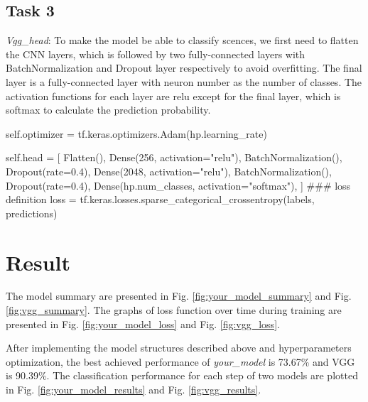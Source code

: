 \subsection*{Task 3}

\emph{Vgg\_head}: To make the model be able to classify scences, we first need to flatten the CNN layers, which is followed by two fully-connected layers with BatchNormalization and Dropout layer respectively to avoid overfitting. The final layer is a fully-connected layer with neuron number as the number of classes. The activation functions for each layer are relu except for the final layer, which is softmax to calculate the prediction probability.
    \begin{python}
self.optimizer = tf.keras.optimizers.Adam(hp.learning_rate)

self.head = [
    Flatten(),
    Dense(256, activation="relu"),
    BatchNormalization(),
    Dropout(rate=0.4),
    Dense(2048, activation="relu"),
    BatchNormalization(),
    Dropout(rate=0.4),
    Dense(hp.num_classes, activation="softmax"),
]
### loss definition
loss = tf.keras.losses.sparse_categorical_crossentropy(labels, predictions)
    \end{python}

\section*{Result}

The model summary are presented in Fig. \ref{fig:your_model_summary} and Fig. \ref{fig:vgg_summary}. The graphs of loss function over time during training are presented in Fig. \ref{fig:your_model_loss} and Fig. \ref{fig:vgg_loss}. 

After implementing the model structures described above and hyperparameters optimization, the best achieved performance of \emph{your\_model} is 73.67\% and VGG is 90.39\%. The classification performance for each step of two models are plotted in Fig. \ref{fig:your_model_results} and Fig. \ref{fig:vgg_results}.

